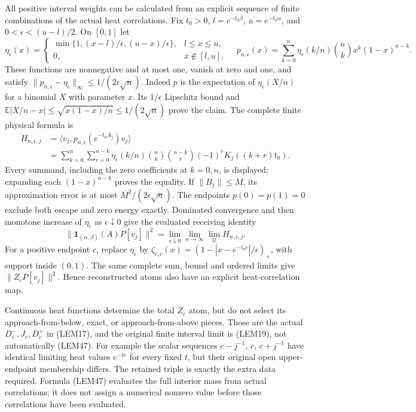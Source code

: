 \documentclass[11pt]{article}
\begin{document}
All positive interval weights can be calculated from an explicit sequence of finite combinations of the actual heat correlations. Fix \(t_0>0\), \(l=e^{-t_0\beta}\), \(u=e^{-t_0\alpha}\), and \(0<\epsilon<(u-l)/2\). On \([0,1]\) let
\[
\eta_\epsilon(x)=
\begin{cases}
\min\{1,(x-l)/\epsilon,(u-x)/\epsilon\},&l\le x\le u,\\
0,&x\notin[l,u],
\end{cases}
\quad
p_{n,\epsilon}(x)=\sum_{k=0}^n\eta_\epsilon(k/n)
                {n\choose k}x^k(1-x)^{n-k}.
\tag{LEM45}
\]
These functions are nonnegative and at most one, vanish at zero and one, and satisfy
\(\|p_{n,\epsilon}-\eta_\epsilon\|_\infty\le1/(2\epsilon\sqrt n)\).
Indeed \(p\) is the expectation of \(\eta_\epsilon(X/n)\) for a binomial \(X\) with parameter \(x\). Its \(1/\epsilon\) Lipschitz bound and
\(\mathbb E|X/n-x|\le\sqrt{x(1-x)/n}\le1/(2\sqrt n)\) prove the claim.
The complete finite physical formula is
\[
\begin{aligned}
H_{n,\epsilon,j}
&=\langle v_j,p_{n,\epsilon}(e^{-t_0A_j})v_j\rangle\\
&=\sum_{k=0}^n\sum_{r=0}^{n-k}
\eta_\epsilon(k/n){n\choose k}{n-k\choose r}(-1)^r
                       K_j((k+r)t_0).
\end{aligned}\tag{LEM46}
\]
Every summand, including the zero coefficients at \(k=0,n\), is displayed; expanding each \((1-x)^{n-k}\) proves the equality. If \(\|B_j\|\le M\), its approximation error is at most \(M^2/(2\epsilon\sqrt n)\). The endpoints \(p(0)=p(1)=0\) exclude both escape and zero energy exactly. Dominated convergence and then monotone increase of \(\eta_\epsilon\) as \(\epsilon\downarrow0\) give the evaluated receiving identity
\[
\|\mathbf1_{(\alpha,\beta)}(A)P[v_j]\|^2
=\lim_{\epsilon\downarrow0}\lim_{n\to\infty}
                  \lim_{\mathcal U}H_{n,\epsilon,j}.
\tag{LEM47}
\]
For a positive endpoint \(c\), replace \(\eta_\epsilon\) by
\(\zeta_{\epsilon,c}(x)=(1-|x-e^{-t_0c}|/\epsilon)_+\), with support inside \((0,1)\). The same complete sum, bound and ordered limits give \(\|Z_cP[v_j]\|^2\). Hence reconstructed atoms also have an explicit heat-correlation map.

Continuous heat functions determine the total \(Z_c\) atom, but do not select its approach-from-below, exact, or approach-from-above pieces. Those are the actual \(D_c^-,J_c,D_c^+\) in (LEM17), and the original finite interval limit is (LEM19), not automatically (LEM47). For example the scalar sequences \(c-j^{-1}\), \(c\), \(c+j^{-1}\) have identical limiting heat values \(e^{-tc}\) for every fixed \(t\), but their original open upper-endpoint membership differs. The retained triple is exactly the extra data required. Formula (LEM47) evaluates the full interior mass from actual correlations; it does not assign a numerical nonzero value before those correlations have been evaluated.
\end{document}
